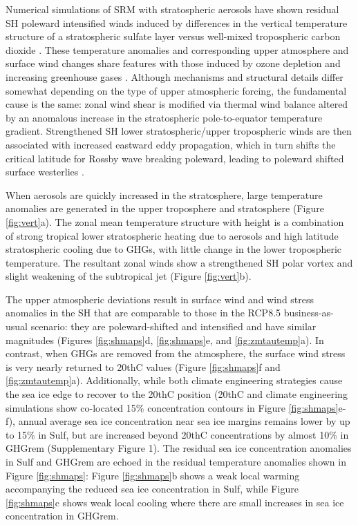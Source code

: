 \documentclass{nature}
\begin{document}
Numerical simulations of SRM with stratospheric aerosols have shown residual SH poleward intensified winds induced by differences in the vertical temperature structure of a stratospheric sulfate layer versus well-mixed tropospheric carbon dioxide \cite{ammann10,mccusker12}. These temperature anomalies and corresponding upper atmosphere and surface wind changes share features with those induced by ozone depletion \cite{gillett03,gillett13,sigmond11,thompson11} and increasing greenhouse gases \cite{gillett13,sigmond11,polvani11}. Although mechanisms and structural details differ somewhat depending on the type of upper atmospheric forcing, the fundamental cause is the same: zonal wind shear is modified via thermal wind balance altered by an anomalous increase in the stratospheric pole-to-equator temperature gradient. Strengthened SH lower stratospheric/upper tropospheric winds are then associated with increased eastward eddy propagation, which in turn shifts the critical latitude for Rossby wave breaking poleward, leading to poleward shifted surface westerlies \cite{chen07}.

When aerosols are quickly increased in the stratosphere, large temperature anomalies are generated in the upper troposphere and stratosphere (Figure \ref{fig:vert}a). The zonal mean temperature structure with height is a combination of strong tropical lower stratospheric heating due to aerosols \cite{ferraro11} and high latitude stratospheric cooling due to GHGs, with little change in the lower tropospheric temperature. The resultant zonal winds show a strengthened SH polar vortex and slight weakening of the subtropical jet (Figure \ref{fig:vert}b). 

The upper atmospheric deviations result in surface wind and wind stress anomalies in the SH that are comparable to those in the RCP8.5 business-as-usual scenario: they are poleward-shifted and intensified and have similar magnitudes (Figures \ref{fig:shmaps}d, \ref{fig:shmaps}e, and \ref{fig:zmtautemp}a). In contrast, when GHGs are removed from the atmosphere, the surface wind stress is very nearly returned to 20thC values (Figure \ref{fig:shmaps}f and \ref{fig:zmtautemp}a). Additionally, while both climate engineering strategies cause the sea ice edge to recover to the 20thC position (20thC and climate engineering simulations show co-located 15\% concentration contours in Figure \ref{fig:shmaps}e-f), annual average sea ice concentration near sea ice margins remains lower by up to 15\% in Sulf, but are increased beyond 20thC concentrations by almost 10\% in GHGrem (Supplementary Figure 1). The residual sea ice concentration anomalies in Sulf and GHGrem are echoed in the residual temperature anomalies shown in Figure \ref{fig:shmaps}: Figure \ref{fig:shmaps}b shows a weak local warming accompanying the reduced sea ice concentration in Sulf, while Figure \ref{fig:shmaps}c shows weak local cooling where there are small increases in sea ice concentration in GHGrem. 
\end{document}
